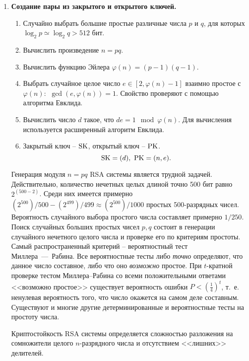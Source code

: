 \begin{enumerate}
    \item \textbf{Создание пары из закрытого и открытого ключей.}
        \begin{enumerate}
            \item Случайно выбрать большие простые различные числа $p$ и $q$, для которых $\log_2 p \simeq \log_2 q > 512$ бит.
            \item Вычислить произведение $n = pq$.
            \item Вычислить функцию Эйлера $\varphi(n) = (p-1)(q-1)$.
            \item Выбрать случайное целое число $e \in [2, \varphi(n)-1]$ взаимно простое с $\varphi(n)$: $~ \gcd(e, \varphi(n)) = 1$. Свойство проверяют с помощью алгоритма Евклида.
            \item Вычислить число $d$ такое, что  $d e= 1 \mod \varphi(n)$. Для вычисления используется расширенный алгоритм Евклида.
            \item Закрытый ключ -- $\textrm{SK}$, открытый ключ -- $\textrm{PK}$.
                \[ \textrm{SK} = (d), ~ \textrm{PK} = (n, e). \]

        \end{enumerate}

Генерация модуля $n = pq$ RSA системы является трудной задачей. Действительно, количество нечетных целых длиной точно 500 бит равно $2^{(500-2)}$. Среди них имеется примерно
$(2^{500})/500 - (2^{499})/499 \approx (2^{500})/1000$ простых 500-разрядных чисел. Вероятность случайного выбора простого числа составляет примерно $1/250 $.
Поиск случайных больших простых чисел $p,q$ состоит в генерации случайного нечетного целого числа и проверке его по критериям простоты. Самый распространенный критерий -- вероятностный тест Миллера~---~Рабина. Все вероятностные тесты либо \emph{точно} определяют, что данное число составное, либо что оно \emph{возможно} простое. При $t$-кратной проверке тестом Миллера--Рабина со всеми положительными ответами <<возможно простое>> существует вероятность ошибки $P < \left( \frac{1}{4} \right)^t$, т.~е. ненулевая вероятность того, что число окажется на самом деле составным. Существуют и многие другие детерминированные и вероятностные тесты на простоту числа.

Криптостойкость RSA системы определяется сложностью разложения на сомножители целого $n$-разрядного числа и отсутствием <<лишних>> делителей.


\end{enumerate}
